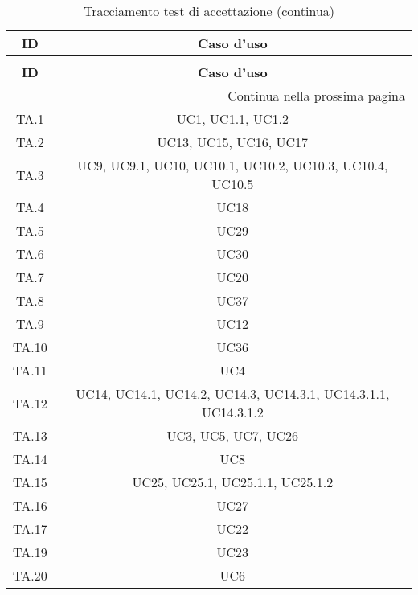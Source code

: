 \bgroup
\begin{adjustwidth}{-0.5cm}{-0.5cm}
	\centering
  \begin{longtable}{|c|c|}
		\caption{Tracciamento test di accettazione}
  	\label{tab:tracciamento-test-accettazione} \\
    \hline
		\textbf{ID} & \textbf{Caso d'uso} \\
		\hline
		\endfirsthead

		\caption[]{Tracciamento test di accettazione (continua)} \\
		\hline
		\textbf{ID} & \textbf{Caso d'uso} \\
		\hline
		\endhead

		\hline
		\multicolumn{2}{|r|}{{Continua nella prossima pagina}} \\
		\hline
		\endfoot

		\hline
		\endlastfoot

    TA.1 & UC1, UC1.1, UC1.2\\
		\hline TA.2 & UC13, UC15, UC16, UC17\\
		\hline TA.3 & UC9, UC9.1, UC10, UC10.1, UC10.2, UC10.3, UC10.4, UC10.5\\
		\hline TA.4 & UC18\\
		\hline TA.5 & UC29\\
		\hline TA.6 & UC30\\
		\hline TA.7 & UC20\\
		\hline TA.8 & UC37\\
		\hline TA.9 & UC12\\
		\hline TA.10 & UC36\\
		\hline TA.11 & UC4\\
		\hline TA.12 & UC14, UC14.1, UC14.2, UC14.3, UC14.3.1, UC14.3.1.1, UC14.3.1.2\\
		\hline TA.13 & UC3, UC5, UC7, UC26\\
		\hline TA.14 & UC8\\
		\hline TA.15 & UC25, UC25.1, UC25.1.1, UC25.1.2\\
		\hline TA.16 & UC27\\
		\hline TA.17 & UC22\\
		\hline TA.19 & UC23\\
		\hline TA.20 & UC6\\
  \end{longtable}
\end{adjustwidth}
\egroup
